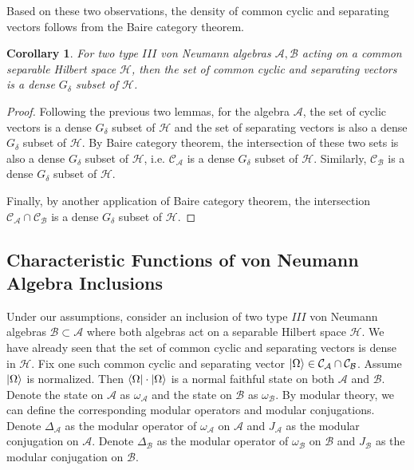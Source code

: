 \documentclass[a4paper,11pt]{article}
\newtheorem{corollary}[theorem]{Corollary}
\theoremstyle{definition}
\begin{document}
Based on these two observations, the density of common cyclic and separating vectors follows from the Baire category theorem. 
\begin{corollary}
    For two type $III$ von Neumann algebras $\mathcal{A}, \mathcal{B}$ acting on a common separable Hilbert space $\mathcal{H}$, then the set of common cyclic and separating vectors is a dense $G_\delta$ subset of $\mathcal{H}$.
\end{corollary}
\begin{proof}
    Following the previous two lemmas, for the algebra $\mathcal{A}$, the set of cyclic vectors is a dense $G_\delta$ subset of $\mathcal{H}$ and the set of separating vectors is also a dense $G_\delta$ subset of $\mathcal{H}$. By Baire category theorem, the intersection of these two sets is also a dense $G_\delta$ subset of $\mathcal{H}$, i.e. $\mathcal{C}_\mathcal{A}$ is a dense $G_\delta$ subset of $\mathcal{H}$. Similarly, $\mathcal{C}_\mathcal{B}$ is a dense $G_\delta$ subset of $\mathcal{H}$.

    Finally, by another application of Baire category theorem, the intersection $\mathcal{C}_\mathcal{A}\cap\mathcal{C}_\mathcal{B}$ is a dense $G_\delta$ subset of $\mathcal{H}$.
\end{proof}
\subsection{Characteristic Functions of von Neumann Algebra Inclusions}\label{subsection:characteristicfunctions}
Under our assumptions, consider an inclusion of two type $III$ von Neumann algebras $\mathcal{B}\subset \mathcal{A}$ where both algebras act on a separable Hilbert space $\mathcal{H}$. We have already seen that the set of common cyclic and separating vectors is dense in $\mathcal{H}$. Fix one such common cyclic and separating vector $\ket{\Omega}\in\mathcal{C}_\mathcal{A}\cap\mathcal{C}_\mathcal{B}$. Assume $\ket{\Omega}$ is normalized. Then $\bra{\Omega}\cdot\ket{\Omega}$ is a normal faithful state on both $\mathcal{A}$ and $\mathcal{B}$. Denote the state on $\mathcal{A}$ as $\omega_\mathcal{A}$ and the state on $\mathcal{B}$ as $\omega_\mathcal{B}$. By modular theory, we can define the corresponding modular operators and modular conjugations. Denote $\Delta_\mathcal{A}$ as the modular operator of $\omega_\mathcal{A}$ on $\mathcal{A}$ and $J_\mathcal{A}$ as the modular conjugation on $\mathcal{A}$. Denote $\Delta_\mathcal{B}$ as the modular operator of $\omega_\mathcal{B}$ on $\mathcal{B}$ and $J_\mathcal{B}$ as the modular conjugation on $\mathcal{B}$.
\end{document}
